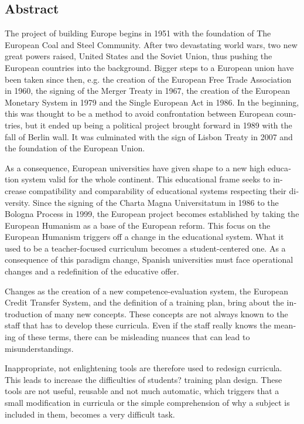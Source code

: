 \begin{otherlanguage}{english}

\chapter*{Abstract}

The project of building Europe begins in 1951 with the foundation of The European Coal and Steel Community. After two devastating world wars, two new great powers raised, United States and the Soviet Union, thus pushing the European countries into the background. Bigger steps to a European union have been taken since then, e.g. the creation of the European Free Trade Association in 1960, the signing of the Merger Treaty in 1967, the creation of the European Monetary System in 1979 and the Single European Act in 1986. In the beginning, this was thought to be a method to avoid confrontation between European countries, but it ended up being a political project brought forward in 1989 with the fall of Berlin wall. It was culminated with the sign of Lisbon Treaty in 2007 and the foundation of the European Union. 

As a consequence, European universities have given shape to a new high education system valid for the whole continent. This educational frame seeks to increase compatibility and comparability of educational systems respecting their diversity. Since the signing of the Charta Magna Universitatum in 1986 to the Bologna Process in 1999, the European project becomes established by taking the European Humanism as a base of the European reform. This focus on the European Humanism triggers off a change in the educational system. What it used to be a teacher-focused curriculum becomes a student-centered one. As a consequence of this paradigm change, Spanish universities must face operational changes and a redefinition of the educative offer.

Changes as the creation of a new competence-evaluation system, the European Credit Transfer System, and the definition of a training plan, bring about the introduction of many new concepts. These concepts are not always known to the staff that has to develop these curricula. Even if the staff really knows the meaning of these terms, there can be misleading nuances that can lead to misunderstandings. 

Inappropriate, not enlightening tools are therefore used to redesign curricula. This leads to increase the difficulties of students? training plan design. These tools are not useful, reusable and not much automatic, which triggers that a small modification in curricula or the simple comprehension of why a subject is included in them, becomes a very difficult task. 


\end{otherlanguage}
